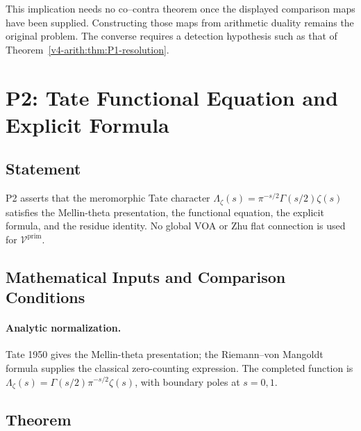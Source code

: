 This implication needs no co--contra theorem once the displayed
comparison maps have been supplied. Constructing those maps from
arithmetic duality remains the original problem. The converse requires
a detection hypothesis such as that of
Theorem~\ref{v4-arith:thm:P1-resolution}.

\section{P2: Tate Functional Equation and Explicit Formula}
\label{v4-arith:cl:P2-resolution}

\subsection{Statement}

P2 asserts that the meromorphic Tate character
\(\Lambda_{\zeta}(s)=\pi^{-s/2}\Gamma(s/2)\zeta(s)\) satisfies the
Mellin-theta presentation, the functional equation, the explicit
formula, and the residue identity. No global VOA or Zhu flat
connection is used for \(\mathcal{V}^{\mathrm{prim}}\).

\subsection{Mathematical Inputs and Comparison Conditions}

\paragraph{Analytic normalization.} Tate 1950 gives the Mellin-theta
presentation; the Riemann--von Mangoldt formula supplies the classical
zero-counting expression. The completed function is
\(\Lambda_{\zeta}(s)=\Gamma(s/2)\pi^{-s/2}\zeta(s)\), with boundary
poles at \(s=0,1\).

\subsection{Theorem}

